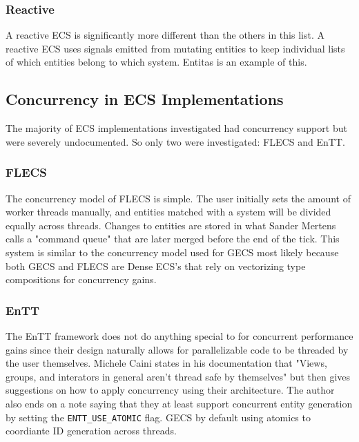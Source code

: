 \subsubsection{Reactive}
A reactive ECS is significantly more different than the others in this list. A reactive ECS uses signals emitted from mutating entities to keep individual lists of which entities belong to which system. Entitas is an example of this. \cite{SanderMertensECS}

\subsection{Concurrency in ECS Implementations}
The majority of ECS implementations investigated had concurrency support but were severely undocumented. So only two were investigated: FLECS and EnTT.

\subsubsection{FLECS}
The concurrency model of FLECS is simple. The user initially sets the amount of worker threads manually, and entities matched with a system will be divided equally across threads. Changes to entities are stored in what Sander Mertens calls a "command queue" that are later merged before the end of the tick.\cite{missing_docs} This system is similar to the concurrency model used for GECS most likely because both GECS and FLECS are Dense ECS's that rely on vectorizing type compositions for concurrency gains.

\subsubsection{EnTT}
The EnTT framework does not do anything special to for concurrent performance gains since their design naturally allows for parallelizable code to be threaded by the user themselves. Michele Caini states in his documentation that "Views, groups, and interators in general aren't thread safe by themselves" but then gives suggestions on how to apply concurrency using their architecture. The author also ends on a note saying that they at least support concurrent entity generation by setting the \texttt{ENTT\_USE\_ATOMIC} flag.\cite{EnTT_multithreading} GECS by default using atomics to coordiante ID generation across threads.